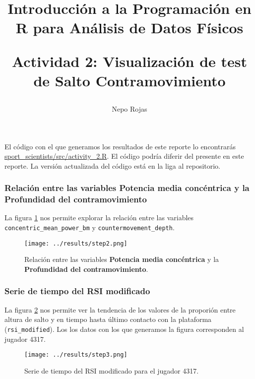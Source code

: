 

\author{Nepo Rojas}

\title{Introducción a la Programación en R para Análisis de Datos Físicos \\ \begin{large}
    Actividad 2: Visualización de test de Salto Contramovimiento \end{large}}



\maketitle

El código con el que generamos los resultados de este reporte lo encontrarás
\href{https://github.com/niesfutbol/sport_scientists/blob/develop/src/activity_2.R}{sport\_scientists/src/activity\_2.R}.
El código podría diferir del presente en este reporte. La versión actualizada del código está en la
liga al repositorio.

\subsubsection*{Relación entre las variables Potencia media concéntrica y la Profundidad del contramovimiento}
La figura \ref{fig:step2} nos permite explorar la relación entre las variables
\texttt{concentric\_mean\_power\_bm} y \texttt{countermovement\_depth}.
\begin{figure}[H]
\centering
\texttt{[image: ../results/step2.png]}
\caption{Relación entre las variables \textbf{Potencia media concéntrica} y la \textbf{Profundidad
del contramovimiento}.}
\label{fig:step2}
\end{figure}

\subsubsection*{Serie de tiempo del RSI modificado}
La figura \ref{fig:step3} nos permite ver la tendencia de los valores de la proporión entre altura
de salto y en tiempo hasta último contacto con la plataforma (\texttt{rsi\_modified}). Los los datos
con los que generamos la figura corresponden al jugador 4317.
\begin{figure}[H]
\centering
\texttt{[image: ../results/step3.png]}
\caption{Serie de tiempo del RSI modificado para el jugador 4317.}
\label{fig:step3}
\end{figure}
